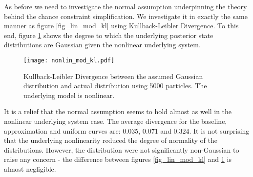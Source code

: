 As before we need to investigate the normal assumption underpinning the theory behind the chance constraint simplification. We investigate it in exactly the same manner as figure \ref{fig_lin_mod_kl} using Kullback-Leibler Divergence. To this end, figure \ref{fig_nonlin_mod_kl} shows the degree to which the underlying posterior state distributions are Gaussian given the nonlinear underlying system.
\begin{figure}[H] 
\centering
\texttt{[image: nonlin\_mod\_kl.pdf]}
\caption{Kullback-Leibler Divergence between the assumed Gaussian distribution and actual distribution using 5000 particles. The underlying model is nonlinear.}
\label{fig_nonlin_mod_kl}
\end{figure}
It is a relief that the normal assumption seems to hold almost as well in the nonlinear underlying system case. The average divergence for the baseline, approximation and uniform curves are: $0.035$, $0.071$ and $0.324$. It is not surprising that the underlying nonlinearity reduced the degree of normality of the distributions. However, the distribution were not significantly non-Gaussian to raise any concern - the difference between figures \ref{fig_lin_mod_kl} and \ref{fig_nonlin_mod_kl} is almost negligible.

